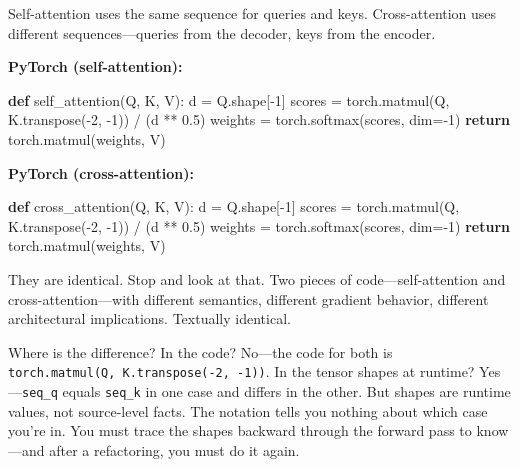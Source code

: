 \documentclass[11pt,titlepage]{article}
\newenvironment{Shaded}{}{}
\newcommand{\ControlFlowTok}[1]{\textcolor[rgb]{0.00,0.44,0.13}{\textbf{#1}}}
\newcommand{\DecValTok}[1]{\textcolor[rgb]{0.25,0.63,0.44}{#1}}
\newcommand{\FloatTok}[1]{\textcolor[rgb]{0.25,0.63,0.44}{#1}}
\newcommand{\KeywordTok}[1]{\textcolor[rgb]{0.00,0.44,0.13}{\textbf{#1}}}
\newcommand{\NormalTok}[1]{#1}
\newcommand{\OperatorTok}[1]{\textcolor[rgb]{0.40,0.40,0.40}{#1}}
\begin{document}
Self-attention uses the same sequence for queries and keys.
Cross-attention uses different sequences---queries from the decoder,
keys from the encoder.

\textbf{PyTorch (self-attention):}

\begin{Shaded}
\begin{Highlighting}[]
\KeywordTok{def}\NormalTok{ self_attention(Q, K, V):}
\NormalTok{    d }\OperatorTok{=}\NormalTok{ Q.shape[}\OperatorTok{-}\DecValTok{1}\NormalTok{]}
\NormalTok{    scores }\OperatorTok{=}\NormalTok{ torch.matmul(Q, K.transpose(}\OperatorTok{-}\DecValTok{2}\NormalTok{, }\DecValTok{-1}\NormalTok{)) }\OperatorTok{/}\NormalTok{ (d }\OperatorTok{**} \FloatTok{0.5}\NormalTok{)}
\NormalTok{    weights }\OperatorTok{=}\NormalTok{ torch.softmax(scores, dim}\OperatorTok{=-}\DecValTok{1}\NormalTok{)}
    \ControlFlowTok{return}\NormalTok{ torch.matmul(weights, V)}
\end{Highlighting}
\end{Shaded}

\textbf{PyTorch (cross-attention):}

\begin{Shaded}
\begin{Highlighting}[]
\KeywordTok{def}\NormalTok{ cross_attention(Q, K, V):}
\NormalTok{    d }\OperatorTok{=}\NormalTok{ Q.shape[}\OperatorTok{-}\DecValTok{1}\NormalTok{]}
\NormalTok{    scores }\OperatorTok{=}\NormalTok{ torch.matmul(Q, K.transpose(}\OperatorTok{-}\DecValTok{2}\NormalTok{, }\DecValTok{-1}\NormalTok{)) }\OperatorTok{/}\NormalTok{ (d }\OperatorTok{**} \FloatTok{0.5}\NormalTok{)}
\NormalTok{    weights }\OperatorTok{=}\NormalTok{ torch.softmax(scores, dim}\OperatorTok{=-}\DecValTok{1}\NormalTok{)}
    \ControlFlowTok{return}\NormalTok{ torch.matmul(weights, V)}
\end{Highlighting}
\end{Shaded}

They are identical. Stop and look at that. Two pieces of
code---self-attention and cross-attention---with different semantics,
different gradient behavior, different architectural implications.
Textually identical.

Where is the difference? In the code? No---the code for both is
\texttt{torch.matmul(Q,\ K.transpose(-2,\ -1))}. In the tensor shapes at
runtime? Yes---\texttt{seq\_q} equals \texttt{seq\_k} in one case and
differs in the other. But shapes are runtime values, not source-level
facts. The notation tells you nothing about which case you're in. You
must trace the shapes backward through the forward pass to know---and
after a refactoring, you must do it again.
\end{document}
